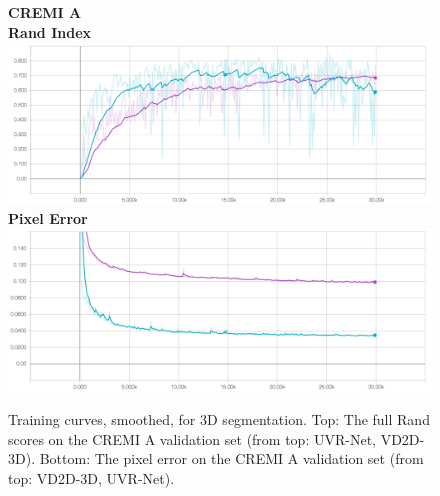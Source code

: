 \begin{figure}
\centering
\textbf{CREMI A} \\
\textbf{Rand Index}
\includegraphics[width=\textwidth]{img/cremi_a_rand.png} \\
\textbf{Pixel Error}
\includegraphics[width=\textwidth]{img/cremi_a_px_err.png}

\caption[Training curves for 3D segmentation for CREMI A]{Training curves, smoothed, for 3D segmentation. Top: The full Rand scores on the CREMI A validation set (from top: UVR-Net, VD2D-3D). Bottom: The pixel error on the CREMI A validation set (from top: VD2D-3D, UVR-Net).}
\label{fig:cremi_a_training_curves}

\end{figure}

